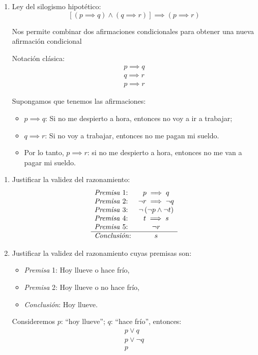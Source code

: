\begin{enumerate}[label=\alph*)]
	\item Ley del silogismo hipotético:
	\[ \left[(p \implies q) \land (q \implies r)\right] \implies \left( p \implies r \right)  \]
	
	Nos permite combinar dos afirmaciones condicionales para obtener una nueva afirmación condicional
	
	Notación clásica:
	\[
	\begin{array}{l}
		p  \implies q\\
		q \implies r \\ \hline
		p \implies r
	\end{array}
	\]
	\begin{fmd-example}
		Supongamos que tenemos las afirmaciones:
		\begin{itemize}
			\item $p \implies q$: Si no me despierto a hora, entonces no voy a ir a trabajar;
			\item $q \implies r$: Si no voy a trabajar, entonces no me pagan mi sueldo.
			\item Por lo tanto, $p \implies r$: si no me despierto a hora, entonces no me van a pagar mi sueldo.
		\end{itemize}
	\end{fmd-example}
\end{enumerate}

\begin{fmd-example}
	\begin{enumerate}
		\item Justificar la validez del razonamiento:
		\[
		\begin{array}{lc}
			\mbox{\textit{Premisa} 1:} & p \implies q\\
			\mbox{\textit{Premisa} 2:} & \neg r \implies \neg q \\
			\mbox{\textit{Premisa} 3:} & \neg \left( \neg p \land \neg t \right) \\
			\mbox{\textit{Premisa} 4:} & t \implies s \\
			\mbox{\textit{Premisa} 5:} & \neg r \\ \hline
			\mbox{\textit{Conclusión}:} & s
		\end{array}
		\]
		\item Justificar la validez del razonamiento cuyas premisas son:
		\begin{itemize}
			\item \textit{Premisa} 1: Hoy llueve o hace frío,
			\item \textit{Premisa} 2: Hoy llueve o no hace frío,
			\item \textit{Conclusión}: Hoy llueve.
		\end{itemize}
		
		Consideremos $p$: ``hoy llueve''; $q$: ``hace frío'', entonces:
		\[ 
		\begin{array}{l}
			p \lor q\\
			p \lor \neg q \\ \hline
			p
		\end{array}
		\]
	\end{enumerate}
\end{fmd-example}

